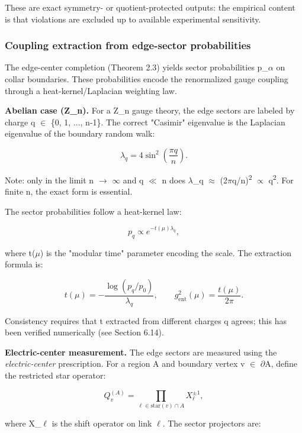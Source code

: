 These are exact symmetry- or quotient-protected outputs: the empirical content is that violations are excluded up to available experimental sensitivity.

\subsubsection{Coupling extraction from edge-sector probabilities}\label{613-coupling-extraction-from-edge-sector-probabilities}

The edge-center completion (Theorem 2.3) yields sector probabilities p\_\ensuremath{\alpha} on collar boundaries. These probabilities encode the renormalized gauge coupling through a heat-kernel/Laplacian weighting law.

\textbf{Abelian case (Z\_n).} For a Z\_n gauge theory, the edge sectors are labeled by charge q \ensuremath{\in} \{0, 1, ..., n-1\}. The correct "Casimir" eigenvalue is the Laplacian eigenvalue of the boundary random walk:

\[
\lambda_q = 4 \sin^2\left(\frac{\pi q}{n}\right).
\]

Note: only in the limit n \ensuremath{\to} \ensuremath{\infty} and q \ensuremath{\ll} n does \ensuremath{\lambda}\_q \ensuremath{\approx} (2\ensuremath{\pi}q/n)\textsuperscript{2} \ensuremath{\propto} q\textsuperscript{2}. For finite n, the exact form is essential.

The sector probabilities follow a heat-kernel law:

\[
p_q \propto e^{-t(\mu) \lambda_q},
\]

where t(\ensuremath{\mu}) is the "modular time" parameter encoding the scale. The extraction formula is:

\[
t(\mu) = -\frac{\log(p_q/p_0)}{\lambda_q}, \qquad
g_{\mathrm{ent}}^2(\mu) = \frac{t(\mu)}{2\pi}.
\]

Consistency requires that t extracted from different charges q agrees; this has been verified numerically (see Section 6.14).

\textbf{Electric-center measurement.} The edge sectors are measured using the \emph{electric-center} prescription. For a region A and boundary vertex v \ensuremath{\in} \ensuremath{\partial}A, define the restricted star operator:

\[
Q_v^{(A)} = \prod_{\ell \in \mathrm{star}(v) \cap A} X_\ell^{\pm 1},
\]

where X\_\ensuremath{\ell} is the shift operator on link \ensuremath{\ell}. The sector projectors are:

